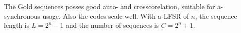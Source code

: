 The Gold sequences posses good auto- and crosscorelation, suitable for a-synchronous usage.
Also the codes scale well.
With a LFSR of $n$, the sequence length is $L = 2^n - 1$ and the number of sequences is $C = 2^n + 1$.











